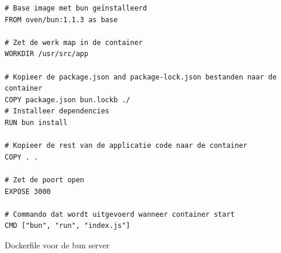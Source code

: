 \begin{listing}[H]
  \centering
  \begin{verbatim}
# Base image met bun geïnstalleerd
FROM oven/bun:1.1.3 as base

# Zet de werk map in de container
WORKDIR /usr/src/app

# Kopieer de package.json and package-lock.json bestanden naar de container
COPY package.json bun.lockb ./
# Installeer dependencies
RUN bun install

# Kopieer de rest van de applicatie code naar de container
COPY . .

# Zet de poort open
EXPOSE 3000

# Commando dat wordt uitgevoerd wanneer container start
CMD ["bun", "run", "index.js"]
      \end{verbatim}
      \caption{\label{code:dockerbun}Dockerfile voor de bun server}
\end{listing}

